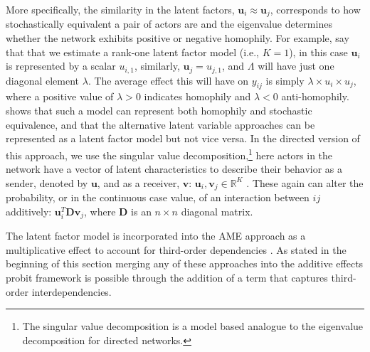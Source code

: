 \documentclass[12pt,pdflatex]{elsarticle}
\begin{document}
More specifically, the similarity in the latent factors, $\textbf{u}_{i} \approx \textbf{u}_{j}$, corresponds to how stochastically equivalent a pair of actors are and the eigenvalue determines whether the network exhibits positive or negative homophily. For example, say that that we estimate a rank-one latent factor model (i.e., $K=1$), in this case $\textbf{u}_{i}$ is represented by a scalar $u_{i,1}$, similarly, $\textbf{u}_{j}=u_{j,1}$, and $\Lambda$ will have just one diagonal element $\lambda$. The average effect this will have on $y_{ij}$ is simply $\lambda \times u_{i} \times u_{j}$, where a positive value of $\lambda>0$ indicates homophily and $\lambda<0$ anti-homophily. \citet{hoff:2008} shows that such a model can represent both homophily and stochastic equivalence, and that the alternative latent variable approaches can be represented as a latent factor model but not vice versa. In the directed version of this approach, we use the singular value decomposition,\footnote{The singular value decomposition is a model based analogue to the eigenvalue decomposition for directed networks.} here actors in the network have a vector of latent characteristics to describe their behavior as a sender, denoted by $\textbf{u}$, and as a receiver, $\textbf{v}$: $\textbf{u}_{i}, \textbf{v}_{j} \in \mathbb{R}^{K}$ \citep{hoff:2009}. These again can alter the probability, or in the continuous case value, of an interaction between $ij$ additively: $\textbf{u}_{i}^{T} \textbf{D} \textbf{v}_{j}$, where $\textbf{D}$ is an $n \times n$ diagonal matrix. 

The latent factor model is incorporated into the AME approach as a multiplicative effect to account for third-order dependencies \citep{hoff:2009,hoff:etal:2015}. As stated in the beginning of this section merging any of these approaches into the additive effects probit framework is possible through the addition of a term that captures third-order interdependencies. 
\end{document}
